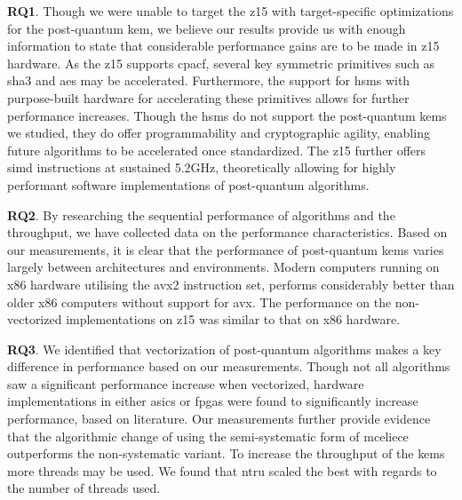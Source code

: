 \noindent \textbf{RQ1}. Though we were unable to target the \gls{z15} with target-specific optimizations for the \gls{post-quantum} \gls{kem}, we believe our results provide us with enough information to state that considerable performance gains are to be made in \gls{z15} hardware. As the \gls{z15} supports \gls{cpacf}, several key symmetric primitives such as \gls{sha3} and \gls{aes} may be accelerated. Furthermore, the support for \glspl{hsm} with purpose-built hardware for accelerating these primitives allows for further performance increases. Though the \glspl{hsm} do not support the \gls{post-quantum} \glspl{kem} we studied, they do offer programmability and cryptographic agility, enabling future algorithms to be accelerated once standardized. The \gls{z15} further offers \gls{simd} instructions at sustained 5.2GHz, theoretically allowing for highly performant software implementations of \gls{post-quantum} algorithms. 

\textbf{RQ2}. By researching the sequential performance of algorithms and the throughput, we have collected data on the performance characteristics. Based on our measurements, it is clear that the performance of \gls{post-quantum} \glspl{kem} varies largely between architectures and environments. Modern computers running on \gls{x86} hardware utilising the \gls{avx2} instruction set, performs considerably better than older \gls{x86} computers without support for \gls{avx}. The performance on the non-vectorized implementations on \gls{z15} was similar to that on \gls{x86} hardware.

\textbf{RQ3}. We identified that vectorization of \gls{post-quantum} algorithms makes a key difference in performance based on our measurements. Though not all algorithms saw a significant performance increase when vectorized, hardware implementations in either \glspl{asic} or \glspl{fpga} were found to significantly increase performance, based on literature. Our measurements further provide evidence that the algorithmic change of using the semi-systematic form of \gls{mceliece} outperforms the non-systematic variant. To increase the throughput of the \glspl{kem} more threads may be used. We found that \gls{ntru} scaled the best with regards to the number of threads used.


